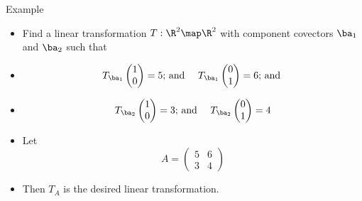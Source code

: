 \documentclass{beamer}
\begin{document}

\beamerdefaultoverlayspecification{<+->}

\begin{frame}{Example}
\begin{itemize}
\item Find a linear transformation $T:\R^2\map\R^2$ with component covectors
$\ba_1$ and $\ba_2$ such that
\item
$$
\begin{matrix}
T_{\ba_1}\begin{pmatrix} 1 \\ 0 \end{pmatrix} = 5
\text{; and }
&
T_{\ba_1}\begin{pmatrix} 0 \\ 1  \end{pmatrix} = 6
\text{; and }
\end{matrix}
$$
\item
$$
\begin{matrix}
T_{\ba_2}\begin{pmatrix} 1 \\ 0   \end{pmatrix} = 3
\text{; and }
&
T_{\ba_2}\begin{pmatrix} 0 \\ 1   \end{pmatrix} = 4
\end{matrix}
$$
\item Let
$$
A =
\begin{pmatrix}
5 & 6 \\
3 & 4
\end{pmatrix}
$$
\item Then $T_A$ is the desired linear transformation.
\end{itemize}
\end{frame}
\end{document}
